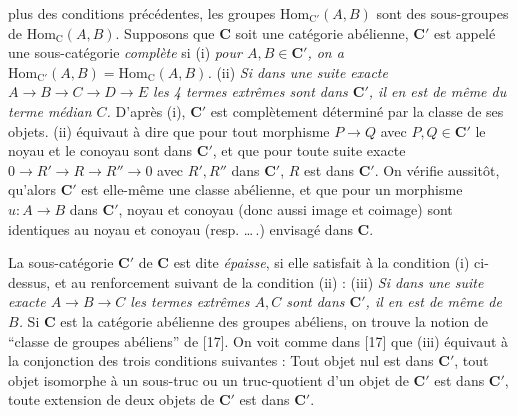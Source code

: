 
\noindent plus des conditions précédentes, les groupes
$\mathrm{Hom}_{\mathrm{C}'}(A,B)$ sont des sous-groupes de
$\mathrm{Hom}_{\mathrm{C}}(A,B)$.
Supposons que $\mathbf{C}$ soit une catégorie abélienne, $\mathbf{C}'$ est appelé une
sous-catégorie \textit{complète} si (i) \textit{pour $A,B\in \mathbf{C}'$, on a
$\mathrm{Hom}_{\mathrm{C}'}(A,B)=\mathrm{Hom}_{\mathrm{C}}(A,B)$.} (ii) \textit{Si dans une
suite exacte $A\to B\to C\to
D\to E$ les 4 termes extrêmes sont dans $\mathbf{C}'$, il en est de même
du terme médian $C$.} D'après (i), $\mathbf{C}'$ est complètement déterminé par la
classe de ses objets. (ii) équivaut à dire que pour tout morphisme
$P\to Q$ avec $P,Q\in \mathbf{C}'$ le noyau et le conoyau sont dans $\mathbf{C}'$,
et que pour toute suite exacte
$0\to R'\to R\to R''\to 0$
avec $R',R''$ dans $\mathbf{C}'$, $R$ est dans $\mathbf{C}'$. On vérifie aussitôt, qu'alors
$\mathbf{C}'$ est elle-même une classe abélienne, et que pour un morphisme
$u:A\to B$ dans $\mathbf{C}'$, noyau et conoyau (donc aussi image et
coimage) sont identiques au noyau et conoyau (resp. \ldots\,.) envisagé dans
$\mathbf{C}$.

La sous-catégorie $\mathbf{C}'$ de $\mathbf{C}$ est dite \textit{épaisse}, si elle satisfait à
la condition (i) ci-dessus, et au renforcement suivant de la condition (ii) :
(iii) \textit{Si dans une suite exacte
$A\to B\to C$ les termes extrêmes $A,C$ sont dans
$\mathbf{C}'$, il en est de même de $B$.} Si $\mathbf{C}$ est la catégorie abélienne des
groupes abéliens, on trouve la notion de ``classe de groupes abéliens'' de
[17]. On voit comme dans [17] que (iii) équivaut à la conjonction des trois
conditions suivantes : Tout objet nul est dans $\mathbf{C}'$, tout objet isomorphe à
un sous-truc ou un truc-quotient d'un objet de $\mathbf{C}'$ est dans $\mathbf{C}'$, toute
extension de deux objets de $\mathbf{C}'$ est dans $\mathbf{C}'$.

